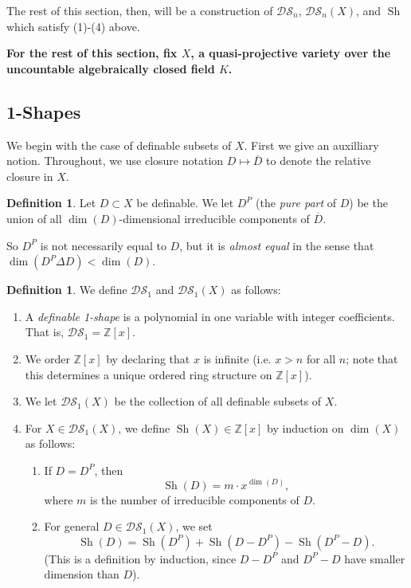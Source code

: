 \documentclass{amsart}
\theoremstyle{definition}
\newtheorem{definition}[theorem]{Definition}
\begin{document}
The rest of this section, then, will be a construction of $\mathcal{DS}_n$, $\mathcal{DS}_n(X)$, and $\operatorname{Sh
}$ which satisfy (1)-(4) above.

\textbf{For the rest of this section, fix $X$, a quasi-projective variety over the uncountable algebraically closed field $K$.}

\subsection{1-Shapes}

We begin with the case of definable subsets of $X$. First we give an auxilliary notion. Throughout, we use closure notation $D\mapsto\overline D$ to denote the relative closure in $X$.

\begin{definition}
    Let $D\subset X$ be definable. We let $D^P$ (the \textit{pure part} of $D$) be the union of all $\dim(D)$-dimensional irreducible components of $\overline D$.
\end{definition}

So $D^P$ is not necessarily equal to $D$, but it is \textit{almost equal} in the sense that $\dim(D^P\Delta D)<\dim(D)$.

\begin{definition}\label{D: 1 shape} We define $\mathcal{DS}_1$ and $\mathcal{DS}_1(X)$ as follows:
    \begin{enumerate}
        \item A \textit{definable 1-shape} is a polynomial in one variable with integer coefficients. That is, $\mathcal{DS}_1=\mathbb Z[x]$.
        \item We order $\mathbb Z[x]$ by declaring that $x$ is infinite (i.e. $x>n$ for all $n$; note that this determines a unique ordered ring structure on $\mathbb Z[x]$).
        \item We let $\mathcal{DS}_1(X)$ be the collection of all definable subsets of $X$.
        \item For $X\in\mathcal{DS}_1(X)$, we define $\operatorname{Sh}(X)\in\mathbb Z[x]$ by induction on $\dim(X)$ as follows:
        \begin{enumerate}
            \item If $D=D^P$, then $$\operatorname{Sh}(D)=m\cdot x^{\dim(D)},$$ where $m$ is the number of irreducible components of $D$.
            \item For general $D\in\mathcal{DS}_1(X)$, we set $$\operatorname{Sh}(D)=\operatorname{Sh}(D^P)+\operatorname{Sh}(D-D^P)-\operatorname{Sh}(D^P-D).$$ (This is a definition by induction, since $D-D^P$ and $D^P-D$ have smaller dimension than $D$).
        \end{enumerate}
    \end{enumerate}
\end{definition}
\end{document}
